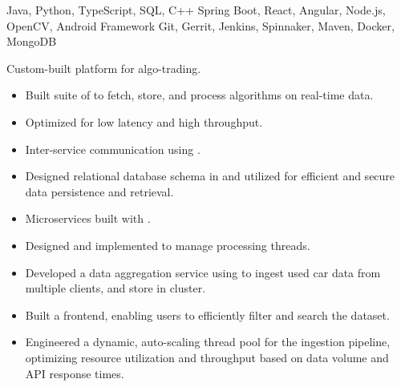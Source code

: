  Java, Python, TypeScript, SQL, C++\newline
{} Spring Boot, React, Angular, Node.js, OpenCV, Android Framework\newline
{} Git, Gerrit, Jenkins, Spinnaker, Maven, Docker, MongoDB\newline


Custom-built platform for algo-trading.
\begin{itemize}
  \item Built  suite of  to fetch, store, and process algorithms on real-time  data.
  \item Optimized for low latency and high throughput.
  \item Inter-service communication using .
  \item Designed relational database schema in  and utilized  for efficient and secure data persistence and retrieval.
  \item Microservices built with .
  \item Designed and implemented  to manage processing threads.
 \end{itemize}

\begin{itemize}
    \item Developed a data aggregation service using  to ingest used car data from multiple clients, and store in  cluster.
    \item Built a  frontend, enabling users to efficiently filter and search the dataset.
    \item Engineered a dynamic, auto-scaling thread pool for the ingestion pipeline, optimizing resource utilization and throughput based on data volume and API response times.
 \end{itemize}
 
